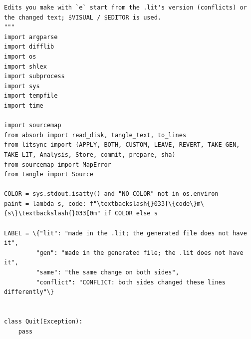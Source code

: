 \documentclass[10pt,a4paper]{article}
\begin{document}
\begin{Verbatim}
Edits you make with `e` start from the .lit's version (conflicts) or the changed text; $VISUAL / $EDITOR is used.
"""
import argparse
import difflib
import os
import shlex
import subprocess
import sys
import tempfile
import time

import sourcemap
from absorb import read_disk, tangle_text, to_lines
from litsync import (APPLY, BOTH, CUSTOM, LEAVE, REVERT, TAKE_GEN, TAKE_LIT, Analysis, Store, commit, prepare, sha)
from sourcemap import MapError
from tangle import Source

COLOR = sys.stdout.isatty() and "NO_COLOR" not in os.environ
paint = lambda s, code: f"\textbackslash{}033[\{code\}m\{s\}\textbackslash{}033[0m" if COLOR else s

LABEL = \{"lit": "made in the .lit; the generated file does not have it",
         "gen": "made in the generated file; the .lit does not have it",
         "same": "the same change on both sides",
         "conflict": "CONFLICT: both sides changed these lines differently"\}


class Quit(Exception):
    pass
\end{Verbatim}
\end{document}
